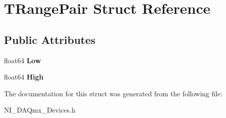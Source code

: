 \hypertarget{struct_t_range_pair}{\section{T\+Range\+Pair Struct Reference}
\label{struct_t_range_pair}
}
\subsection*{Public Attributes}
\begin{DoxyCompactItemize}
\item 
\hypertarget{struct_t_range_pair_ac62259e858bfb9bb00551b8e13b58857}{float64 {\bfseries Low}}\label{struct_t_range_pair_ac62259e858bfb9bb00551b8e13b58857}

\item 
\hypertarget{struct_t_range_pair_a685bc37e654447bd68cbfd9d29c20f4b}{float64 {\bfseries High}}\label{struct_t_range_pair_a685bc37e654447bd68cbfd9d29c20f4b}

\end{DoxyCompactItemize}


The documentation for this struct was generated from the following file\+:\begin{DoxyCompactItemize}
\item 
N\+I\+\_\+\+D\+A\+Qmx\+\_\+\+Devices.\+h\end{DoxyCompactItemize}

